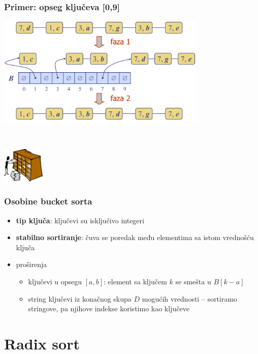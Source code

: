 \documentclass[compress]{beamer}
\begin{document}
\begin{frame}
  \frametitle{Primer: opseg ključeva [0,9]}
  \includegraphics[width=10cm]{asp-12-pic32.png}
  
  \ %
  
  \hfill\includegraphics[width=2cm]{asp-12-pic33.png}
\end{frame}

\begin{frame}
  \frametitle{Osobine bucket sorta}
  \begin{itemize}
    \item \textbf{tip ključa}: ključevi su isključivo integeri
    \item \textbf{stabilno sortiranje}: čuva se poredak među elementima sa istom vrednošću ključa
    \item proširenja
    \begin{itemize}
      \item ključevi u opsegu $[a,b]$: element sa ključem $k$ se smešta u $B[k-a]$
      \item string ključevi iz konačnog skupa $D$ mogućih vrednosti -- sortiramo stringove, pa njihove indekse koristimo kao ključeve
    \end{itemize}
  \end{itemize}
\end{frame}

\section[Radix sort]{Radix sort}
\end{document}
